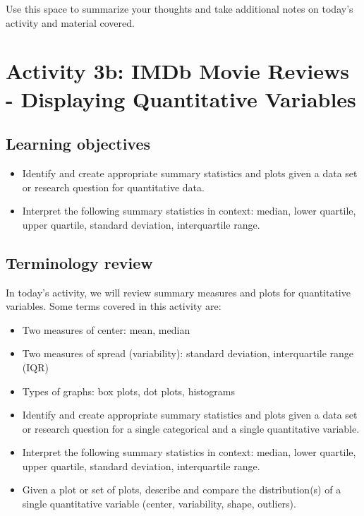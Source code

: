 \documentclass[
]{report}
\begin{document}
Use this space to summarize your thoughts and take additional notes on today's activity and material covered.

\newpage

\hypertarget{activity-3b-imdb-movie-reviews---displaying-quantitative-variables}{%
\section{Activity 3b: IMDb Movie Reviews - Displaying Quantitative Variables}\label{activity-3b-imdb-movie-reviews---displaying-quantitative-variables}}


\hypertarget{learning-objectives}{%
\subsection{Learning objectives}\label{learning-objectives}}

\begin{itemize}
\item
  Identify and create appropriate summary statistics and plots
  given a data set or research question for quantitative data.
\item
  Interpret the following summary statistics in context:
  median, lower quartile, upper quartile,
  standard deviation, interquartile range.
\end{itemize}

\hypertarget{terminology-review-5}{%
\subsection{Terminology review}\label{terminology-review-5}}

In today's activity, we will review summary measures and plots for quantitative variables. Some terms covered in this activity are:

\begin{itemize}
\item
  Two measures of center: mean, median
\item
  Two measures of spread (variability): standard deviation, interquartile range (IQR)
\item
  Types of graphs: box plots, dot plots, histograms
\item
  Identify and create appropriate summary statistics and plots given a data set or research question for a single categorical and a single quantitative variable.
\item
  Interpret the following summary statistics in context:
  median, lower quartile, upper quartile,
  standard deviation, interquartile range.
\item
  Given a plot or set of plots, describe and compare the distribution(s)
  of a single quantitative variable
  (center, variability, shape, outliers).
\end{itemize}
\end{document}

